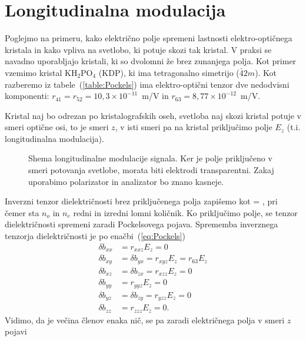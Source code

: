 \section{Longitudinalna modulacija}
Poglejmo na primeru, kako električno polje spremeni lastnosti elektro-optičnega kristala
in kako vpliva na svetlobo, ki potuje skozi tak kristal. V praksi se navadno uporabljajo 
kristali, ki so dvolomni že brez zunanjega polja. 
Kot primer vzemimo kristal KH$_{2}$PO$_{4}$ (KDP), ki ima tetragonalno 
simetrijo ($\bar{4}2m$). Kot razberemo iz tabele~(\ref{table:Pockels}) ima 
elektro-optični tenzor dve nedodvisni komponenti: $r_{41} = r_{52}=10,3 \times 10^{-11}$~m/V
in $r_{63}=8,77 \times 10^{-12}$~m/V.

Kristal naj bo odrezan po kristalografskih oseh, svetloba naj skozi kristal potuje 
v smeri optične osi, to je smeri $z$, v isti smeri pa na kristal priključimo
polje $E_z$ (t.i. longitudinalna modulacija). 
\begin{figure}[h]
\centering
\def\svgwidth{80truemm} 

\caption{Shema longitudinalne modulacije signala. Ker je polje priključeno v smeri
potovanja svetlobe, morata biti elektrodi transparentni. Zakaj uporabimo polarizator in analizator
bo znano kasneje.}
\label{fig:amshema}
\end{figure}
Inverzni tenzor dielektričnosti brez priključenega polja zapišemo kot
\beq
\underline{} = 
,
\label{7.8}
\eeq
pri čemer sta $n_o$ in $n_e$ redni in izredni lomni količnik. Ko priključimo 
polje, se tenzor dielektričnosti spremeni zaradi Pockelsovega pojava. Sprememba
inverznega tenzorja dielektričnosti je po enačbi~(\ref{eq:Pockels})
\begin{align}
\delta b_{xx} & =r_{xxz}E_z = 0\\
\delta b_{xy} & = \delta b_{yx} = r_{xyz}E_z = r_{63}E_z\\
\delta b_{xz} & = \delta b_{zx} =r_{xzz}E_z = 0\\
\delta b_{yy} & =r_{yyz}E_z = 0\\
\delta b_{yz} & = \delta b_{zy} =r_{yzz}E_z = 0\\
\delta b_{zz} & =r_{zzz}E_z = 0.
\end{align}
Vidimo, da je večina členov enaka nič, se pa zaradi električnega polja v smeri $z$ pojavi 
